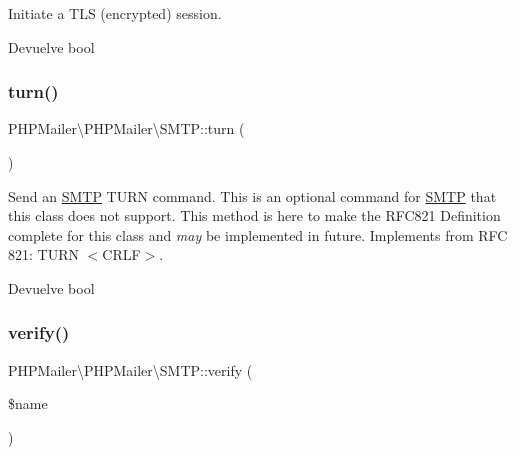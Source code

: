 Initiate a T\+LS (encrypted) session.

\begin{DoxyReturn}{Devuelve}
bool 
\end{DoxyReturn}
\mbox{\label{classPHPMailer_1_1PHPMailer_1_1SMTP_aede265071423497a511daba946ed33f5}} 
\subsubsection{\texorpdfstring{turn()}{turn()}}
{\footnotesize\ttfamily P\+H\+P\+Mailer\textbackslash{}\+P\+H\+P\+Mailer\textbackslash{}\+S\+M\+T\+P\+::turn (\begin{DoxyParamCaption}{ }\end{DoxyParamCaption})}

Send an \hyperlink{classPHPMailer_1_1PHPMailer_1_1SMTP}{S\+M\+TP} T\+U\+RN command. This is an optional command for \hyperlink{classPHPMailer_1_1PHPMailer_1_1SMTP}{S\+M\+TP} that this class does not support. This method is here to make the R\+F\+C821 Definition complete for this class and {\itshape may} be implemented in future. Implements from R\+FC 821\+: T\+U\+RN $<$\+C\+R\+L\+F$>$.

\begin{DoxyReturn}{Devuelve}
bool 
\end{DoxyReturn}
\mbox{\label{classPHPMailer_1_1PHPMailer_1_1SMTP_aa6f0d709ee797863db52b9e4626c7d55}} 
\subsubsection{\texorpdfstring{verify()}{verify()}}
{\footnotesize\ttfamily P\+H\+P\+Mailer\textbackslash{}\+P\+H\+P\+Mailer\textbackslash{}\+S\+M\+T\+P\+::verify (\begin{DoxyParamCaption}\item[{}]{\$name }\end{DoxyParamCaption})}

